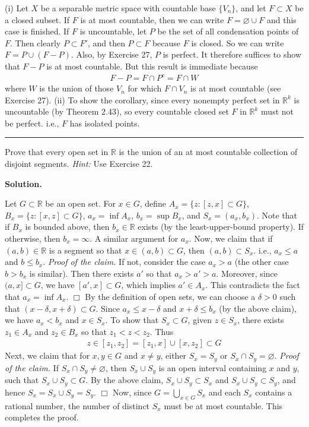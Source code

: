 \documentclass[12pt]{article}
\theoremstyle{definition}
\begin{document}
(i) Let $X$ be a separable metric space with countable base $\{V_n\}$, and let $F\subset X$ be a closed subset. If $F$ is at most countable, then we can write $F=\varnothing\cup F$ and this case is finished. If $F$ is uncountable, let $P$ be the set of all condensation points of $F$. Then clearly $P\subset F'$, and then $P\subset F$ because $F$ is closed. So we can write $F=P\cup(F-P)$. Also, by Exercise 27, $P$ is perfect. It therefore suffices to show that $F-P$ is at most countable. But this result is immediate because
\begin{align*}
F-P
=F\cap P^c
=F\cap W
\end{align*}
where $W$ is the union of those $V_n$ for which $F\cap V_n$ is at most countable (see Exercise 27).
(ii) To show the corollary, since every nonempty perfect set in $\mathbb{R}^k$ is uncountable (by Theorem 2.43), so every countable closed set $F$ in $\mathbb{R}^k$ must not be perfect. i.e., $F$ has isolated points.



\bigskip\noindent\hrule\bigskip

Prove that every open set in $\mathbb{R}$ is the union of an at most countable collection of disjoint segments. \textit{Hint:} Use Exercise 22.

\smallskip
\noindent\textbf{Solution.}\quad

Let $G\subset \mathbb{R}$ be an open set. For $x\in G$, define $A_x=\{z:[z,x]\subset G\}$, $B_x=\{z:[x,z]\subset G\}$, $a_x=\inf A_x$, $b_x=\sup B_x$, and $S_x=(a_x,b_x)$. Note that if $B_x$ is bounded above, then $b_x\in \mathbb{R}$ exists (by the least-upper-bound property). If otherwise, then $b_x=\infty$. A similar argument for $a_x$. Now, we claim that if $(a,b)\in \mathbb{R}$ is a segment so that $x\in(a,b)\subset G$, then $(a,b)\subset S_x$. i.e., $a_x\le a$ and $b\le b_x$.
\textit{Proof of the claim.} If not, consider the case $a_x>a$ (the other case $b>b_x$ is similar). Then there exists $a'$ so that $a_x>a'>a$. Moreover, since $(a,x]\subset G$, we have $[a',x]\subset G$, which implies $a'\in A_x$. This contradicts the fact that $a_x=\inf A_x$. $\Box$
By the definition of open sets, we can choose a $\delta>0$ such that $(x-\delta,x+\delta)\subset G$. Since $a_x\le x-\delta$ and $x+\delta\le b_x$ (by the above claim), we have $a_x<b_x$ and $x\in S_x$. To show that $S_x\subset G$, given $z\in S_x$, there exists $z_1\in A_x$ and $z_2\in B_x$ so that $z_1<z<z_2$. Thus
\begin{align*}
z\in[z_1,z_2]=[z_1,x]\cup[x,z_2]\subset G
\end{align*} 
Next, we claim that for $x,y\in G$ and $x\ne y$, either $S_x=S_y$ or $S_x\cap S_y=\varnothing$.
\textit{Proof of the claim.} If $S_x\cap S_y\ne\varnothing$, then $S_x\cup S_y$ is an open interval containing $x$ and $y$, such that $S_x\cup S_y\subset G$. By the above claim, $S_x\cup S_y\subset S_x$ and $S_x\cup S_y\subset S_y$, and hence $S_x=S_x\cup S_y=S_y$. $\Box$
Now, since $G=\bigcup_{x\in G}S_x$ and each $S_x$ contains a rational number, the number of distinct $S_x$ must be at most countable. This completes the proof.
\end{document}
